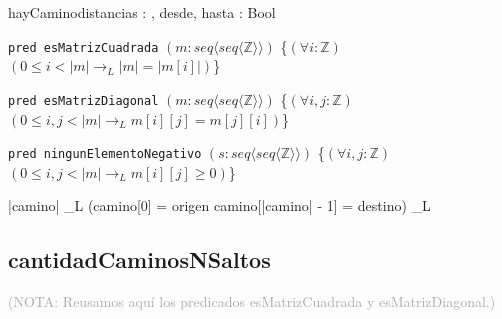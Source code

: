 \documentclass[10pt,a4paper]{article}
\begin{document}
\begin{proc}{hayCamino}{\In distancias : \TLista{\TLista{\ent}}, \In desde, hasta : \ent}{\textsf{Bool}}
\end{proc}

\texttt{pred esMatrizCuadrada} $(m : seq \langle seq \langle \mathbb{Z} \rangle \rangle)$ \{$(\forall i : \mathbb{Z})$ $(0 \leq i < |m| \longrightarrow_L |m| = |m[i]|)$\}

\texttt{pred esMatrizDiagonal} $(m : seq \langle seq \langle \mathbb{Z} \rangle \rangle)$ \{$(\forall i, j : \mathbb{Z})$ $(0 \leq i, j < |m| \longrightarrow_L m[i][j] = m[j][i])$\}
    
\texttt{pred ningunElementoNegativo} $(s : seq \langle seq \langle \mathbb{Z} \rangle \rangle)$ \{$(\forall i, j : \mathbb{Z})$ $(0 \leq i, j < |m| \longrightarrow_L m[i][j] \geq 0)$\}


{|camino|  \land_L (camino[0] = origen \land camino[|camino| - 1] = destino) \land_L \\
}



\subsection{cantidadCaminosNSaltos}

\textcolor{darkgray}{(\textsc{NOTA}: Reusamos aquí los predicados \textsf{esMatrizCuadrada} y \textsf{esMatrizDiagonal}.)}
\end{document}
